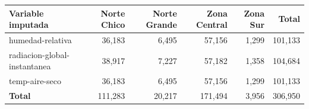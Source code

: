 \begin{tabular}{lrrrrr}
\toprule
Variable imputada & Norte Chico & Norte Grande & Zona Central & Zona Sur & Total \\
\midrule
humedad-relativa & 36,183 & 6,495 & 57,156 & 1,299 & 101,133 \\
radiacion-global-instantanea & 38,917 & 7,227 & 57,182 & 1,358 & 104,684 \\
temp-aire-seco & 36,183 & 6,495 & 57,156 & 1,299 & 101,133 \\
\midrule
\textbf{Total} & 111,283 & 20,217 & 171,494 & 3,956 & 306,950 \\
\bottomrule
\end{tabular}